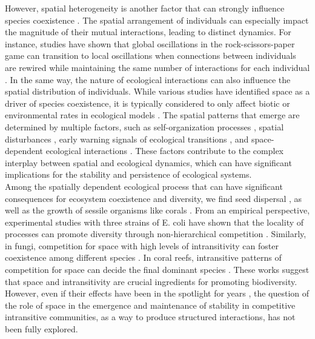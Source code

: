 However, spatial heterogeneity is another factor that can strongly influence species coexistence \cite{valladares2015species,Dieckmann2000,Lowery2019,Travis2005}. The spatial arrangement of individuals can especially impact the magnitude of their mutual interactions, leading to distinct dynamics. For instance, studies have shown that global oscillations in the rock-scissors-paper game can transition to local oscillations when connections between individuals are rewired while maintaining the same number of interactions for each individual \cite{szolnoki2004phase}. In the same way, the nature of ecological interactions can also influence the spatial distribution of individuals. While various studies have identified space as a driver of species coexistence, it is typically considered to only affect biotic or environmental rates in ecological models \cite{Travis2005,Dieckmann2000}. The spatial patterns that emerge are determined by multiple factors, such as self-organization processes \cite{Pascual2002ClusterEcologies}, spatial disturbances \cite{Lowery2019}, early warning signals of ecological transitions \cite{Kefi2007SpatialEcosystems}, and space-dependent ecological interactions \cite{Dieckmann2000}. These factors contribute to the complex interplay between spatial and ecological dynamics, which can have significant implications for the stability and persistence of ecological systems. \\

 Among the spatially dependent ecological process that can have significant consequences for ecosystem coexistence and diversity, we find seed dispersal \cite{Liao2016,Chave2013}, as well as the growth of sessile organisms like corals \cite{buss1979competitive}. From an empirical perspective, experimental studies with three strains of E. coli have shown that the locality of processes can promote diversity through non-hierarchical competition \cite{kerr2002local}. Similarly, in fungi, competition for space with high levels of intransitivity can foster coexistence among different species \cite{maynard2017diversity}. In coral reefs, intransitive patterns of competition for space can decide the final dominant species \cite{buss1979competitive}. These works suggest that space and intransitivity are crucial ingredients for promoting biodiversity. However, even if their effects have been in the spotlight for years \cite{soliveres2018everything}, the question of the role of space in the emergence and maintenance of stability in competitive intransitive communities, as a way to produce structured interactions, has not been fully explored. \\

